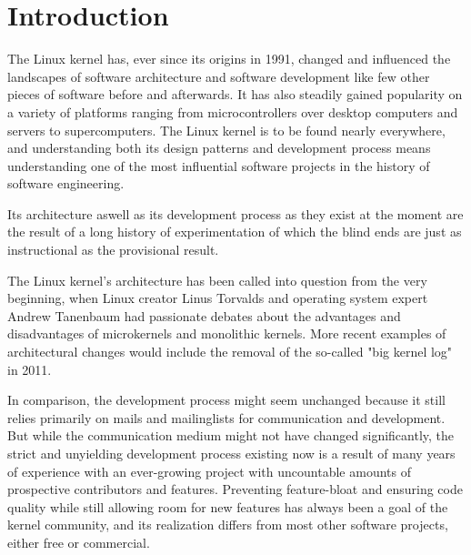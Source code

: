 \documentclass{sig-alternate-05-2015}
\begin{document}


\printccsdesc{}


\section{Introduction}

The Linux kernel has, ever since its origins in 1991, changed and influenced the landscapes of software architecture and software development like few other pieces of software before and afterwards.
It has also steadily gained popularity on a variety of platforms ranging from microcontrollers over desktop computers and servers to supercomputers.
The Linux kernel is to be found nearly everywhere, and understanding both its design patterns and development process means understanding one of the most influential software projects in the history of software engineering.

Its architecture aswell as its development process as they exist at the moment are the result of a long history of experimentation of which the blind ends are just as instructional as the provisional result.

The Linux kernel's architecture has been called into question from the very beginning, when Linux creator Linus Torvalds and operating system expert Andrew Tanenbaum had passionate debates about the advantages and disadvantages of microkernels and monolithic kernels.
More recent examples of architectural changes would include the removal of the so-called "big kernel log" in 2011.

In comparison, the development process might seem unchanged because it still relies primarily on mails and mailinglists for communication and development.
But while the communication medium might not have changed significantly, the strict and unyielding development process existing now is a result of many years of experience with an ever-growing project with uncountable amounts of prospective contributors and features.
Preventing feature-bloat and ensuring code quality while still allowing room for new features has always been a goal of the kernel community, and its realization differs from most other software projects, either free or commercial.
\end{document}
